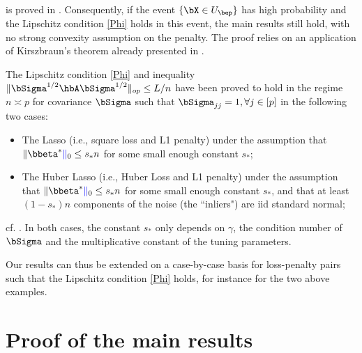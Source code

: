 \documentclass{colt2022} %
\newcommand{\ysc}[1]{{\color{blue} #1}}
\numberwithin{equation}{section}
\begin{document}
 is proved in .
Consequently, if the event $\{\bX\in U_\bep\}$ has high probability
and the Lipschitz condition \eqref{Phi} holds in this event,
the main results  still hold,
with no strong convexity assumption on the penalty.
The proof relies on an application of Kirszbraun's theorem
already presented in \citep{bellec2020out_of_sample}.

The Lipschitz condition \eqref{Phi}
and inequality $\|\bSigma^{1/2}\hbA\bSigma^{1/2}\|_{op}\le L/n$ have
been proved
to hold in the regime $n\asymp p$ for covariance $\bSigma$ such that
$\bSigma_{jj}=1,\forall j\in[p]$
in the following two cases:
\begin{itemize}
\item The Lasso (i.e., square loss and L1 penalty) under the assumption
    that $\|\bbeta^*\ysc{\|}_0 \le s_* n$ for some \ysc{small enough} constant $s_*$;
\item The Huber Lasso (i.e., Huber Loss and L1 penalty)
    under the assumption
    that $\|\bbeta^* \ysc{\|}_0 \le s_* n$ for some small enough constant $s_*$,
    and that
    at least $(1-s_*)n$ components of the noise (the ``inliers") are
    iid standard normal;
\end{itemize}
cf. \citep[Assumption 2.3 and Proposition 12.1]{bellec2020out_of_sample}.
In both cases, the constant $s_*$ only depends on $\gamma$,
the condition number of $\bSigma$ and  the multiplicative constant 
of the tuning parameters.

Our results can thus be extended on a case-by-case basis for loss-penalty pairs
such that the Lipschitz condition \eqref{Phi} holds, for instance
for the two above examples.





\appendix

\section{Proof of the main results}
\end{document}
